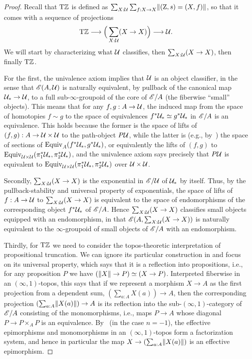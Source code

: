 \documentclass[a4paper,12pt]{amsart}
\begin{document}
\begin{proof}
  Recall that ${\mathrm{T}\mathbb{Z}}$ is defined as $\sum_{X:\mathcal{U}}\sum_{f:X\to X} \lVert(\mathrm{Z},s)=(X,f)\rVert$, so that it comes with a sequence of projections
  \[ {\mathrm{T}\mathbb{Z}} \longrightarrow \Big(\sum_{X:\mathcal{U}} (X\to X)\Big) \longrightarrow \mathcal{U} .\]
  We will start by characterizing what $\mathcal{U}$ classifies, then $\sum_{X:\mathcal{U}} (X\to X)$, then finally ${\mathrm{T}\mathbb{Z}}$.

For the first, the univalence axiom implies that $\mathcal{U}$ is an object classifier, in the sense that $\mathscr{E}(A,\mathcal{U})$ is naturally equivalent, by pullback of the canonical map $\mathcal{U}_*\to \mathcal{U}$, to a full sub-$\infty$-groupoid of the core of $\mathscr{E}/A$ (the fiberwise ``small'' objects).
This means that for any $f,g:A\to \mathcal{U}$, the induced map from the space of homotopies $f\sim g$ to the space of equivalences $f^*\mathcal{U}_* \simeq g^*\mathcal{U}_*$ in $\mathscr{E}/A$ is an equivalence.
This holds because the former is the space of lifts of $(f,g):A\to \mathcal{U}\times \mathcal{U}$ to the path-object $P\mathcal{U}$, while the latter is (e.g., by~\cite[Lemma 4.3]{shulman:elreedy}) the space of sections of $\mathrm{Equiv}_A(f^*\mathcal{U}_*,g^*\mathcal{U}_*)$, or equivalently the lifts of $(f,g)$ to $\mathrm{Equiv}_{\mathcal{U}\times \mathcal{U}}(\pi_1^*\mathcal{U}_*,\pi_2^*\mathcal{U}_*)$, and the univalence axiom says precisely that $P\mathcal{U}$ is equivalent to $\mathrm{Equiv}_{\mathcal{U}\times \mathcal{U}}(\pi_1^*\mathcal{U}_*,\pi_2^*\mathcal{U}_*)$ over $\mathcal{U}\times\mathcal{U}$.

Secondly, $\sum_{X:\mathcal{U}} (X\to X)$ is the exponential in $\mathscr{E}/\mathcal{U}$ of $\mathcal{U}_*$ by itself.
Thus, by the pullback-stability and universal property of exponentials, the space of lifts of $f:A\to \mathcal{U}$ to $\sum_{X:\mathcal{U}} (X\to X)$ is equivalent to the space of endomorphisms of the corresponding object $f^*\mathcal{U}_*$ of $\mathscr{E}/A$.
Hence $\sum_{X:\mathcal{U}} (X\to X)$ classifies small objects equipped with an endomorphism, in that $\mathscr{E}(A, \sum_{X:\mathcal{U}} (X\to X))$ is naturally equivalent to the $\infty$-groupoid of small objects of $\mathscr{E}/A$ with an endomorphism.

Thirdly, for ${\mathrm{T}\mathbb{Z}}$ we need to consider the topos-theoretic interpretation of propositional truncation.
We can ignore its particular construction in \UniMath{} and focus on its universal property, which says that it is a reflection into propositions, i.e., for any proposition $P$ we have $(\lVert X\rVert\to P) \simeq (X\to P)$.
Interpreted fiberwise in an $(\infty,1)$-topos, this says that if we represent a morphism $X\to A$ as the first projection from a dependent sum, $(\sum_{a:A} X(a)) \to A$, then the corresponding projection $(\sum_{a:A} \lVert X(a)\rVert)\to A$ is its reflection into the sub-$(\infty,1)$-category of $\mathscr{E}/A$ consisting of the monomorphisms, i.e., maps $P\to A$ whose diagonal $P\to P\times_A P$ is an equivalence.
By~\cite[Example 5.2.8.16 and Corollary 6.5.1.14]{lurie:higher-topoi} (in the case $n=-1$), the effective epimorphisms and monomorphisms in an $(\infty,1)$-topos form a factorization system, and hence in particular the map $X\to (\sum_{a:A} \lVert X(a)\rVert)$ is an effective epimorphism.


\end{proof}
\end{document}
